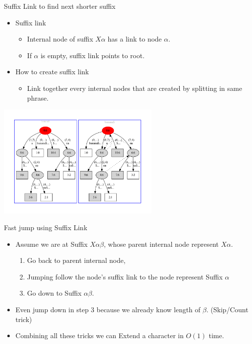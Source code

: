 \begin{frame}{Suffix Link to find next shorter suffix}
\begin{itemize}
\item Suffix link
\begin{itemize}
\item Internal node of suffix $X\alpha$ has a link to node $\alpha$.
\item If $\alpha$ is empty, suffix link points to root.
\end{itemize}
\item How to create suffix link
\begin{itemize}
\item Link together every internal nodes that are created by splitting in same phrase.
\end{itemize}
\end{itemize}

\includegraphics[width=0.6\textwidth,trim=50pt 50pt 50pt 40pt]{sl-banana_.pdf}
\end{frame}
\begin{frame}{Fast jump using Suffix Link}
\begin{itemize}
\item Assume we are at Suffix $X\alpha\beta$, whose parent internal node represent
$X\alpha$. 
\begin{enumerate}
\item Go back to parent internal node,
\item Jumping follow the node's suffix link to the node represent Suffix $\alpha$
\item Go down to Suffix $\alpha\beta$.
\end{enumerate}
\item Even jump down in step 3 because we already know length of $\beta$. (Skip/Count trick)
\item Combining all these tricks we can Extend a character in \alert{$O(1)$} time.
\end{itemize}
\end{frame}

